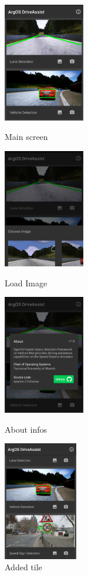 \begin{figure}[H]
	\includegraphics[height=5.2cm]{images/screenshot_main.png}
	\caption{Main screen}\label{fig:main_screen}
	\endminipage\hfill
	\includegraphics[height=5.2cm]{images/screenshot_load_image.png}
	\caption{Load Image}\label{fig:load_image}
	\endminipage\hfill
	\includegraphics[height=5.2cm]{images/screenshot_about.png}
	\caption{About infos}\label{fig:about}
	\endminipage\hfill
	\includegraphics[height=5.2cm]{images/screenshot_new.png}
	\caption{Added tile}\label{fig:new}
	\endminipage
\end{figure}








